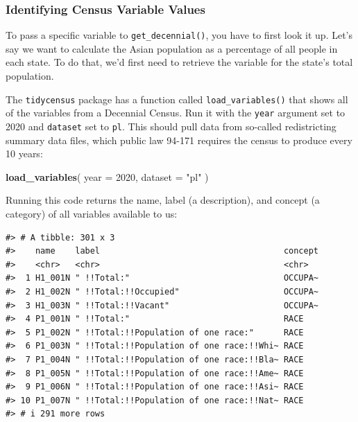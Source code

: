 \documentclass[
]{book}
\newenvironment{Shaded}{\begin{snugshade}}{\end{snugshade}}
\newcommand{\AttributeTok}[1]{\textcolor[rgb]{0.13,0.29,0.53}{#1}}
\newcommand{\DecValTok}[1]{\textcolor[rgb]{0.00,0.00,0.81}{#1}}
\newcommand{\FunctionTok}[1]{\textcolor[rgb]{0.13,0.29,0.53}{\textbf{#1}}}
\newcommand{\NormalTok}[1]{#1}
\newcommand{\StringTok}[1]{\textcolor[rgb]{0.31,0.60,0.02}{#1}}
\begin{document}
\hypertarget{identifying-census-variable-values}{%
\subsubsection*{Identifying Census Variable Values}\label{identifying-census-variable-values}}

To pass a specific variable to \texttt{get\_decennial()}, you have to first look it up. Let's say we want to calculate the Asian population as a percentage of all people in each state. To do that, we'd first need to retrieve the variable for the state's total population.

The \texttt{tidycensus} package has a function called \texttt{load\_variables()} that shows all of the variables from a Decennial Census. Run it with the \texttt{year} argument set to 2020 and \texttt{dataset} set to \texttt{pl}. This should pull data from so-called redistricting summary data files, which public law 94-171 requires the census to produce every 10 years:

\begin{Shaded}
\begin{Highlighting}[]
\FunctionTok{load\_variables}\NormalTok{(}
  \AttributeTok{year =} \DecValTok{2020}\NormalTok{,}
  \AttributeTok{dataset =} \StringTok{"pl"}
\NormalTok{)}
\end{Highlighting}
\end{Shaded}

Running this code returns the name, label (a description), and concept (a category) of all variables available to us:

\begin{verbatim}
#> # A tibble: 301 x 3
#>    name    label                                     concept
#>    <chr>   <chr>                                     <chr>  
#>  1 H1_001N " !!Total:"                               OCCUPA~
#>  2 H1_002N " !!Total:!!Occupied"                     OCCUPA~
#>  3 H1_003N " !!Total:!!Vacant"                       OCCUPA~
#>  4 P1_001N " !!Total:"                               RACE   
#>  5 P1_002N " !!Total:!!Population of one race:"      RACE   
#>  6 P1_003N " !!Total:!!Population of one race:!!Whi~ RACE   
#>  7 P1_004N " !!Total:!!Population of one race:!!Bla~ RACE   
#>  8 P1_005N " !!Total:!!Population of one race:!!Ame~ RACE   
#>  9 P1_006N " !!Total:!!Population of one race:!!Asi~ RACE   
#> 10 P1_007N " !!Total:!!Population of one race:!!Nat~ RACE   
#> # i 291 more rows
\end{verbatim}
\end{document}
